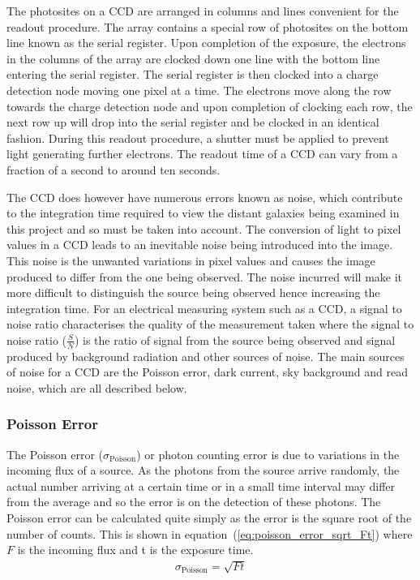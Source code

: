 		The photosites on a CCD are arranged in columns and lines convenient for the readout procedure. The array contains a special row of photosites on the bottom line known as the serial register. Upon completion of the exposure, the electrons in the columns of the array are clocked down one line with the bottom line entering the serial register. The serial register is then clocked into a charge detection node moving one pixel at a time. The electrons move along the row towards the charge detection node and upon completion of clocking each row, the next row up will drop into the serial register and be clocked in an identical fashion\cite{Astronomical_Image_Processing}. During this readout procedure, a shutter must be applied to prevent light generating further electrons. The readout time of a CCD can vary from a fraction of a second to around ten seconds.

		The CCD does however have numerous errors known as noise, which contribute to the integration time required to view the distant galaxies being examined in this project and so must be taken into account. The conversion of light to pixel values in a CCD leads to an inevitable noise being introduced into the image. This noise is the unwanted variations in pixel values and causes the image produced to differ from the one being observed. The noise incurred will make it more difficult to distinguish the source being observed hence increasing the integration time. For an electrical measuring system such as a CCD, a signal to noise ratio characterises the quality of the measurement taken where the signal to noise ratio ($\frac{S}{N}$) is the ratio of signal from the source being observed and signal produced by background radiation and other sources of noise. The main sources of noise for a CCD are the Poisson error, dark current, sky background and read noise, which are all described below.


		\subsubsection{Poisson Error} %
		\label{ssub:poisson_error}
			The Poisson error ($\sigma_\text{Poisson}$) or photon counting error is due to variations in the incoming flux of a source. As the photons from the source arrive randomly, the actual number arriving at a certain time or in a small time interval may differ from the average and so the error is on the detection of these photons. The Poisson error can be calculated quite simply as the error is the square root of the number of counts. This is shown in equation~(\ref{eq:poisson_error_sqrt_Ft}) where $F$ is the incoming flux and t is the exposure time.
			\begin{align}
				\sigma_\text{Poisson} = \sqrt{Ft} \label{eq:poisson_error_sqrt_Ft}
			\end{align}

